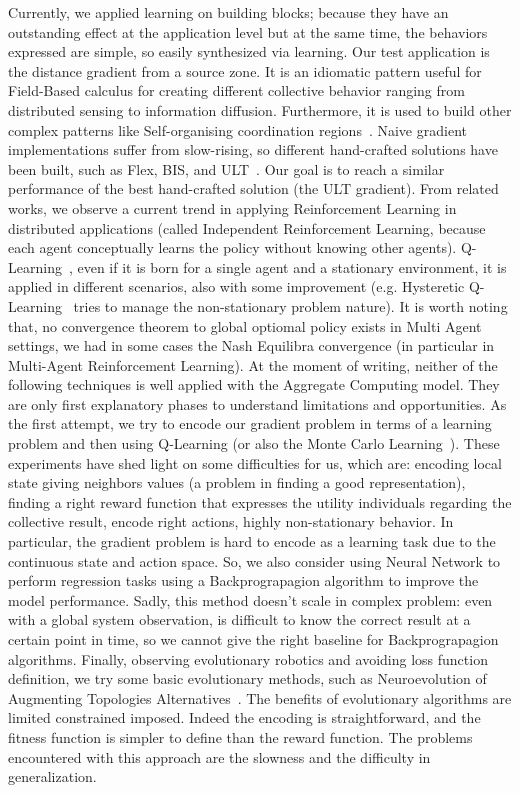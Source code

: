 \documentclass[conference]{IEEEtran}
\begin{document}
Currently, we applied learning on building blocks; because they have an outstanding effect at the application level but
at the same time, the behaviors expressed are simple, so easily synthesized via learning.  %
%
Our test application is the distance gradient from a source zone. 
It is an idiomatic pattern useful for Field-Based calculus for creating different collective behavior ranging from distributed sensing to information diffusion.
Furthermore, it is used to build other complex patterns like Self-organising coordination regions~\cite{DBLP:conf/coordination/CasadeiPVN19}.
%
Naive gradient implementations suffer from slow-rising, so different hand-crafted solutions have been built, such as Flex, BIS, and ULT~\cite{DBLP:conf/saso/AudritoCDV17}.
Our goal is to reach a similar performance of the best hand-crafted solution (the ULT gradient).
%
From related works, we observe a current trend in applying Reinforcement Learning in distributed applications (called Independent Reinforcement Learning, because each agent conceptually learns the policy without knowing other agents).
Q-Learning~\cite{DBLP:journals/ras/Krose95}, even if it is born for a single agent and a stationary environment, it is applied in different scenarios, also with some improvement (e.g. Hysteretic Q-Learning~\cite{DBLP:conf/iros/MatignonLF07} tries to manage the non-stationary problem nature). It is worth noting that, no convergence theorem to global optiomal policy exists in Multi Agent settings, we had in some cases
the Nash Equilibra convergence (in particular in Multi-Agent Reinforcement Learning).
%
At the moment of writing, neither of the following techniques is well applied with the Aggregate Computing model. They are
only first explanatory phases to understand limitations and opportunities.
%
As the first attempt, we try to encode our gradient problem in terms of a learning problem and then using Q-Learning (or also the Monte Carlo Learning~\cite{DBLP:conf/nips/Thrun99}).
These experiments have shed light on some difficulties for us, which are: encoding local state giving neighbors values (a problem in finding a good representation), finding a right reward function that expresses the utility individuals
regarding the collective result, encode right actions, highly non-stationary behavior. 
%
In particular, the gradient problem is hard to encode as a learning task due to the continuous state and action space.
So, we also consider using Neural Network to perform regression tasks using a Backprograpagion algorithm to
improve the model performance. 
Sadly, this method doesn't scale in complex problem: even with a global system observation, is difficult to know the correct result at a certain point in time, so 
we cannot give the right baseline for Backprograpagion algorithms.
%
Finally, observing evolutionary robotics and avoiding loss function definition, we try some basic evolutionary methods, such as Neuroevolution of Augmenting Topologies Alternatives~\cite{DBLP:journals/ec/StanleyM02}.
The benefits of evolutionary algorithms are limited constrained imposed. Indeed the encoding is straightforward, and the fitness function is simpler to define than the reward function.
The problems encountered with this approach are the slowness and the difficulty in generalization.
%
\end{document}
